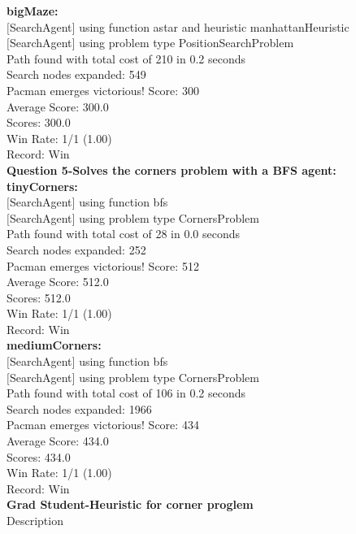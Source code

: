 \documentclass[11pt]{article}
\begin{document}
\noindent
\textbf{bigMaze:}\\
$[$SearchAgent$]$ using function astar and heuristic manhattanHeuristic\\
$[$SearchAgent$]$ using problem type PositionSearchProblem\\
Path found with total cost of 210 in 0.2 seconds\\
Search nodes expanded: 549\\
Pacman emerges victorious! Score: 300\\
Average Score: 300.0\\
Scores:        300.0\\
Win Rate:      1/1 (1.00)\\
Record:        Win\\

\newpage
\noindent
\textbf{Question 5-Solves the corners problem with a BFS agent:}\\
\textbf{tinyCorners:}\\
$[$SearchAgent$]$ using function bfs\\
$[$SearchAgent$]$ using problem type CornersProblem\\
Path found with total cost of 28 in 0.0 seconds\\
Search nodes expanded: 252\\
Pacman emerges victorious! Score: 512\\
Average Score: 512.0\\
Scores:        512.0\\
Win Rate:      1/1 (1.00)\\
Record:        Win\\

\noindent
\textbf{mediumCorners:}\\
$[$SearchAgent$]$ using function bfs\\
$[$SearchAgent$]$ using problem type CornersProblem\\
Path found with total cost of 106 in 0.2 seconds\\
Search nodes expanded: 1966\\
Pacman emerges victorious! Score: 434\\
Average Score: 434.0\\
Scores:        434.0\\
Win Rate:      1/1 (1.00)\\
Record:        Win\\

\newpage
\noindent
\textbf{Grad Student-Heuristic for corner proglem}\\
Description\\
\end{document}
